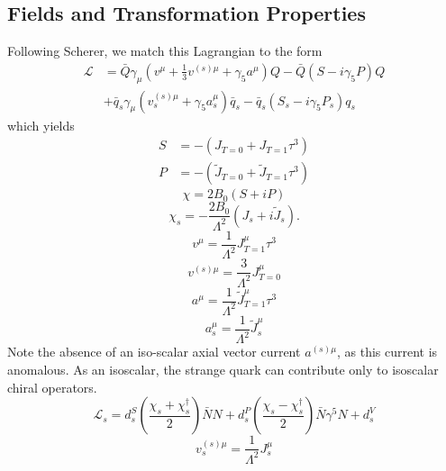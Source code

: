 \documentclass{book}[12pt]
\begin{document}
\subsection{Fields and Transformation Properties}
Following Scherer, we match this Lagrangian to the form
\begin{equation}
\begin{split}
\mathcal{L}&=\bar{Q}\gamma_{\mu}\left(v^{\mu}+\frac{1}{3}v^{(s)\mu}+\gamma_5a^{\mu}\right)Q-\bar{Q}\left(S-i\gamma_5 P\right)Q\\
&+\bar{q}_s\gamma_{\mu}\left(v_s^{(s)\mu}+\gamma_5a_s^{\mu}\right)\bar{q}_s-\bar{q}_s\left(S_s-i\gamma_5 P_s\right)q_s
\end{split}
\end{equation}
which yields
\begin{equation}
\begin{split}
S&=-\left(J_{T=0}+J_{T=1}\tau^3\right)\\
P&=-\left(\tilde{J}_{T=0}+\tilde{J}_{T=1}\tau^3\right)
\end{split}
\end{equation}
\begin{equation}
\chi=2B_0\left(S+iP\right)
\end{equation}
\begin{equation}
\chi_s=-\frac{2B_0}{\Lambda^2}\left(J_s+i\tilde{J}_s\right).
\end{equation}
\begin{equation}
v^{\mu}=\frac{1}{\Lambda^2}J^{\mu}_{T=1}\tau^3
\end{equation}
\begin{equation}
v^{(s)\mu}=\frac{3}{\Lambda^2}J^{\mu}_{T=0}
\end{equation}
\begin{equation}
a^{\mu}=\frac{1}{\Lambda^2}\tilde{J}^{\mu}_{T=1}\tau^3
\end{equation}
\begin{equation}
a^{\mu}_s=\frac{1}{\Lambda^2}\tilde{J}_s^{\mu}
\end{equation}
Note the absence of an iso-scalar axial vector current $a^{(s)\mu}$, as this current is anomalous. As an isoscalar, the strange quark can contribute only to isoscalar chiral operators. 
\begin{equation}
\mathcal{L}_s=d_s^S\left(\frac{\chi_s+\chi_s^{\dag}}{2}\right)\bar{N}N+d_s^P\left(\frac{\chi_s-\chi_s^{\dag}}{2}\right)\bar{N}\gamma^5 N+d_s^V
\end{equation}
\begin{equation}
v_s^{(s)\mu}=\frac{1}{\Lambda^2}J_s^{\mu}
\end{equation}
\end{document}
